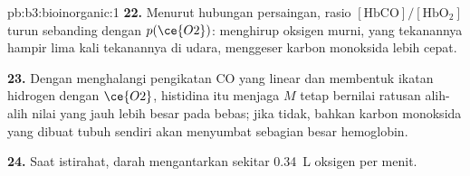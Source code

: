 \begin{solution}{pb:b3:bioinorganic:1}
\textbf{22.} Menurut hubungan persaingan, rasio $[\mathrm{HbCO}]/[\mathrm{HbO_2}]$ turun sebanding dengan $p(\ce{O2})$:
menghirup oksigen murni, yang tekanannya hampir lima kali tekanannya di udara, menggeser karbon
monoksida lebih cepat.

\textbf{23.} Dengan menghalangi pengikatan CO yang linear dan membentuk ikatan hidrogen dengan $\ce{O2}$, histidina itu menjaga $M$ tetap
bernilai ratusan alih-alih nilai yang jauh lebih besar pada  bebas; jika tidak, bahkan
karbon monoksida yang dibuat tubuh sendiri akan menyumbat sebagian besar hemoglobin.

\textbf{24.} Saat istirahat, darah mengantarkan sekitar \qty{0.34}{L} oksigen per menit.
\end{solution}
